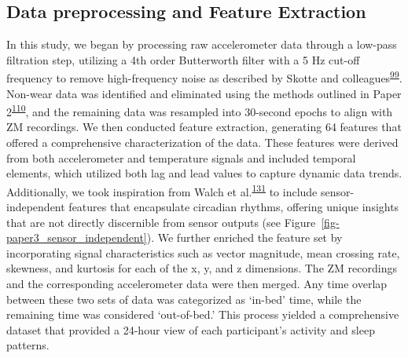 \documentclass[
  9pt,
]{scrbook}
\begin{document}
\hypertarget{data-preprocessing-and-feature-extraction}{%
\subsection{Data preprocessing and Feature
Extraction}\label{data-preprocessing-and-feature-extraction}}

In this study, we began by processing raw accelerometer data through a
low-pass filtration step, utilizing a 4th order Butterworth filter with
a 5 Hz cut-off frequency to remove high-frequency noise as described by
Skotte and
colleagues\textsuperscript{\protect\hyperlink{ref-skotte_detection_2014}{99}}.
Non-wear data was identified and eliminated using the methods outlined
in Paper
2\textsuperscript{\protect\hyperlink{ref-skovgaard_generalizability_2023}{110}},
and the remaining data was resampled into 30-second epochs to align with
ZM recordings. We then conducted feature extraction, generating 64
features that offered a comprehensive characterization of the data.
These features were derived from both accelerometer and temperature
signals and included temporal elements, which utilized both lag and lead
values to capture dynamic data trends. Additionally, we took inspiration
from Walch et
al.\textsuperscript{\protect\hyperlink{ref-walch_sleep_2019}{131}} to
include sensor-independent features that encapsulate circadian rhythms,
offering unique insights that are not directly discernible from sensor
outputs (see Figure~\ref{fig-paper3_sensor_independent}). We further
enriched the feature set by incorporating signal characteristics such as
vector magnitude, mean crossing rate, skewness, and kurtosis for each of
the x, y, and z dimensions. The ZM recordings and the corresponding
accelerometer data were then merged. Any time overlap between these two
sets of data was categorized as `in-bed' time, while the remaining time
was considered `out-of-bed.' This process yielded a comprehensive
dataset that provided a 24-hour view of each participant's activity and
sleep patterns.
\end{document}
